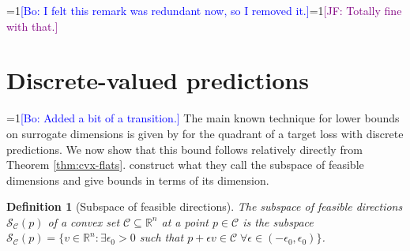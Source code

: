 \documentclass{article}
\newcommand{\Comments}{1}
\newcommand{\mynote}[2]{\ifnum\Comments=1\textcolor{#1}{#2}\fi}
\newcommand{\mytodo}[2]{\ifnum\Comments=1%
	\todo[linecolor=#1!80!black,backgroundcolor=#1,bordercolor=#1!80!black]{#2}\fi}
\newcommand{\raf}[1]{\mynote{green!80!blue}{[RF: #1]}}
\newcommand{\jessie}[1]{\mynote{purple}{[JF: #1]}}
\newcommand{\jessiet}[1]{\mytodo{purple!20!white}{JF: #1}}
\newcommand{\bo}[1]{\mynote{blue}{[Bo: #1]}}
\newcommand{\reals}{\mathbb{R}}
\newcommand{\C}{\mathcal{C}}
\newcommand{\Sc}{\mathcal{S}}  %
\newtheorem{definition}{Definition}
\begin{document}
\bo{I felt this remark was redundant now, so I removed it.}\jessie{Totally fine with that.}

\section{Discrete-valued predictions}\label{sec:finite-calib}

\bo{Added a bit of a transition.}
The main known technique for lower bounds on surrogate dimensions is given by \citet{ramaswamy2016convex} for the quadrant of a target loss with discrete predictions.
We now show that this bound follows relatively directly from Theorem \ref{thm:cvx-flats}.
\citet{ramaswamy2016convex} construct what they call the subspace of feasible dimensions and give bounds in terms of its dimension.
\begin{definition}[Subspace of feasible directions]\label{def:subspace-feas}
	The \emph{subspace of feasible directions} $\Sc_\C(p)$ of a convex set $\C \subseteq \reals^n$ at a point $p \in \C$ is the subspace $\Sc_\C(p) = \{ v \in \reals^n : \exists \epsilon_0 > 0 $ such that $p + \epsilon v \in \C \; \forall \epsilon \in (-\epsilon_0,\epsilon_0) \}$.
\end{definition}
\end{document}
